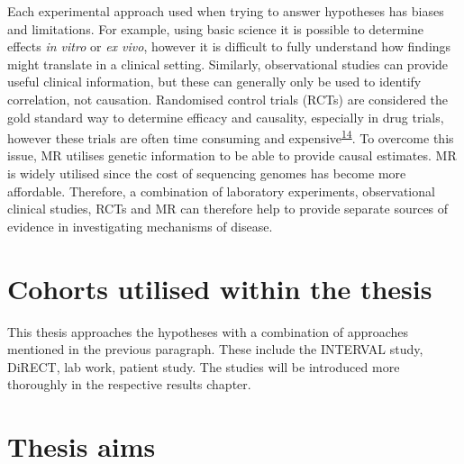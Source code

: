 \documentclass[11pt,twoside]{bristolthesis}
\begin{document}
Each experimental approach used when trying to answer hypotheses has biases and limitations. For example, using basic science it is possible to determine effects \emph{in vitro} or \emph{ex vivo}, however it is difficult to fully understand how findings might translate in a clinical setting. Similarly, observational studies can provide useful clinical information, but these can generally only be used to identify correlation, not causation. Randomised control trials (RCTs) are considered the gold standard way to determine efficacy and causality, especially in drug trials, however these trials are often time consuming and expensive\textsuperscript{\protect\hyperlink{ref-Bennett2017}{14}}. To overcome this issue, MR utilises genetic information to be able to provide causal estimates. MR is widely utilised since the cost of sequencing genomes has become more affordable. Therefore, a combination of laboratory experiments, observational clinical studies, RCTs and MR can therefore help to provide separate sources of evidence in investigating mechanisms of disease.

\hypertarget{cohorts-utilised-within-the-thesis}{%
\section{Cohorts utilised within the thesis}\label{cohorts-utilised-within-the-thesis}}

This thesis approaches the hypotheses with a combination of approaches mentioned in the previous paragraph. These include the INTERVAL study, DiRECT, lab work, patient study. The studies will be introduced more thoroughly in the respective results chapter.

\hypertarget{thesis-aims}{%
\section{Thesis aims}\label{thesis-aims}}
\end{document}
